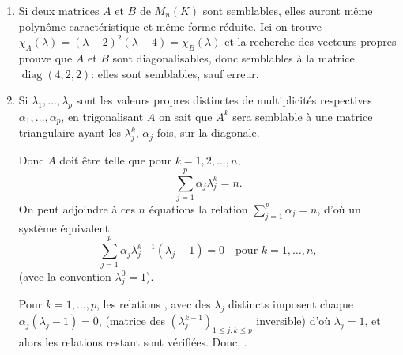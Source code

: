 \begin{enumerate}[label=\arabic*.,leftmargin=2.2em,itemsep=1.1em]
Enfin
\[
R^{-1}BR=
\begin{pmatrix}\alpha'Q^{-1}&\beta'Q^{-1}\\\gamma'Q^{-1}&\delta'Q^{-1}\end{pmatrix}
\begin{pmatrix}2A&-4A\\A&-A\end{pmatrix}
\begin{pmatrix}\alpha Q&\beta Q\\\gamma Q&\delta Q\end{pmatrix}
\]
va être une matrice bloc, avec des blocs carrés d'ordre $n$ tous proportionnels à $Q^{-1}AQ=\Lambda$, les coefficients provenant du calcul de $P^{-1}CP=\begin{pmatrix}\lambda&0\\0&\mu\end{pmatrix}$ d'où
\[
R^{-1}BR=\begin{pmatrix}\lambda\Lambda&0\\0&\mu\Lambda\end{pmatrix}
\]
est bien diagonale.

\item Si deux matrices $A$ et $B$ de $M_n(K)$ sont semblables, elles auront même polynôme caractéristique et même forme réduite.
Ici on trouve $\chi_A(\lambda)=(\lambda-2)^2(\lambda-4)=\chi_B(\lambda)$ et la recherche des vecteurs propres prouve que $A$ et $B$ sont diagonalisables, donc semblables à la matrice $\operatorname{diag}(4,2,2)$: elles sont semblables, sauf erreur.

\item Si $\lambda_1,\ldots,\lambda_p$ sont les valeurs propres distinctes de multiplicités respectives $\alpha_1,\ldots,\alpha_p$, en trigonalisant $A$ on sait que $A^k$ sera semblable à une matrice triangulaire ayant les $\lambda_j^k$, $\alpha_j$ fois, sur la diagonale.

Donc $A$ doit être telle que pour $k=1,2,\ldots,n$,
\[
\sum_{j=1}^p\alpha_j\lambda_j^k=n.
\]
On peut adjoindre à ces $n$ équations la relation $\sum_{j=1}^p\alpha_j=n$, d'où un système équivalent:
\[
\sum_{j=1}^p\alpha_j\lambda_j^{k-1}(\lambda_j-1)=0
\quad\text{pour }k=1,\ldots,n,
\]
(avec la convention $\lambda_j^0=1$).

Pour $k=1,\ldots,p$, les relations
,
avec des $\lambda_j$ distincts imposent chaque $\alpha_j(\lambda_j-1)=0$, (matrice des $(\lambda_j^{k-1})_{1\le j,k\le p}$ inversible) d'où $\lambda_j=1$, et alors les relations restant sont vérifiées. Donc,
.


\end{enumerate}
